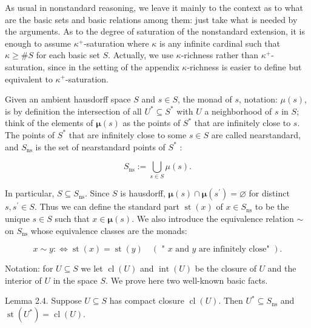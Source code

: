 \documentclass[10pt]{article}
\begin{document}
As usual in nonstandard reasoning, we leave it mainly to the context as to what are the basic sets and basic relations among them: just take what is needed by the arguments. As to the degree of saturation of the nonstandard extension, it is enough to assume $\kappa^{+}$-saturation where $\kappa$ is any infinite cardinal such that $\kappa \geq \# S$ for each basic set $S$. Actually, we use $\kappa$-richness rather than $\kappa^{+}$-saturation, since in the setting of the appendix $\kappa$-richness is easier to define but equivalent to $\kappa^{+}$-saturation.

Given an ambient hausdorff space $S$ and $s \in S$, the monad of $s$, notation: $\mu(s)$, is by definition the intersection of all $U^{*} \subseteq S^{*}$ with $U$ a neighborhood of $s$ in $S$; think of the elements of $\boldsymbol{\mu}(s)$ as the points of $S^{*}$ that are infinitely close to $s$. The points of $S^{*}$ that are infinitely close to some $s \in S$ are called nearstandard, and $S_{\mathrm{ns}}$ is the set of nearstandard points of $S^{*}$ :

$$
S_{\mathrm{ns}}:=\bigcup_{s \in S} \mu(s) .
$$

In particular, $S \subseteq S_{\mathrm{ns}}$. Since $S$ is hausdorff, $\boldsymbol{\mu}(s) \cap \boldsymbol{\mu}\left(s^{\prime}\right)=\varnothing$ for distinct $s, s^{\prime} \in S$. Thus we can define the standard part $\operatorname{st}(x)$ of $x \in S_{\mathrm{ns}}$ to be the unique $s \in S$ such that $x \in \boldsymbol{\mu}(s)$. We also introduce the equivalence relation $\sim$ on $S_{\mathrm{ns}}$ whose equivalence classes are the monads:

$$
x \sim y: \Longleftrightarrow \operatorname{st}(x)=\operatorname{st}(y) \quad(\text { " } x \text { and } y \text { are infinitely close" }) .
$$

Notation: for $U \subseteq S$ we let $\operatorname{cl}(U)$ and $\operatorname{int}(U)$ be the closure of $U$ and the interior of $U$ in the space $S$. We prove here two well-known basic facts.

Lemma 2.4. Suppose $U \subseteq S$ has compact closure $\operatorname{cl}(U)$. Then $U^{*} \subseteq S_{\mathrm{ns}}$ and $\operatorname{st}\left(U^{*}\right)=\operatorname{cl}(U)$.
\end{document}
